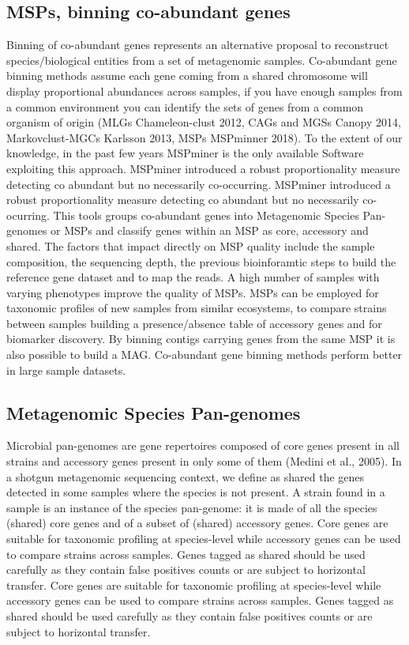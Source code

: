 \documentclass{article}
\begin{document}
\subsection*{MSPs, binning co-abundant genes}
Binning of co-abundant genes represents an alternative proposal to reconstruct species/biological entities from a set of metagenomic samples.
Co-abundant gene binning methods assume each gene coming from a shared chromosome will display proportional abundances across samples, if you have enough samples from a common environment you can identify the sets of genes from a common organism of origin (MLGs Chameleon-clust 2012, CAGs and MGSs Canopy 2014, Markovclust-MGCs Karlsson 2013, MSPs MSPminner 2018).
To the extent of our knowledge, in the past few years MSPminer is the only available Software exploiting this approach. MSPminer introduced a robust proportionality measure detecting co abundant but no necessarily co-occurring.
MSPminer introduced a robust proportionality measure detecting co abundant but no necessarily  co-ocurring.
This tools groups co-abundant genes into Metagenomic Species Pan-genomes or \glspl{MSP} and classify genes within an MSP as core, accessory and shared.  
The factors that impact directly on \gls{MSP} quality include the sample composition, the sequencing depth, the previous bioinforamtic steps to build the reference gene dataset and to map the reads.
A high number of samples with varying phenotypes improve the quality of \glspl{MSP}.
MSPs can be employed for taxonomic profiles of new samples from similar ecosystems, to compare strains between samples building a presence/absence table of accessory genes and for biomarker discovery.
By binning contigs carrying genes from the same MSP it is also possible to build a \gls{MAG}.
Co-abundant gene binning methods perform better in large sample datasets.

\subsection*{Metagenomic Species Pan-genomes}
Microbial pan-genomes are gene repertoires composed of core genes present in all strains and accessory genes present in only some of them (Medini et al., 2005).
In a shotgun metagenomic sequencing context, we define as shared the genes detected in some samples where the species is not present.
A strain found in a sample is an instance of the species pan-genome: it is made of all the species (shared) core genes and of a subset of (shared) accessory genes. Core genes are suitable for taxonomic profiling at species-level while accessory genes can be used to compare strains across samples. Genes tagged as shared should be used carefully as they contain false positives counts or are subject to horizontal transfer.
Core genes are suitable for taxonomic profiling at species-level while accessory genes can be used to compare strains across samples.
Genes tagged as shared should be used carefully as they contain false positives counts or are subject to horizontal transfer.
\end{document}
